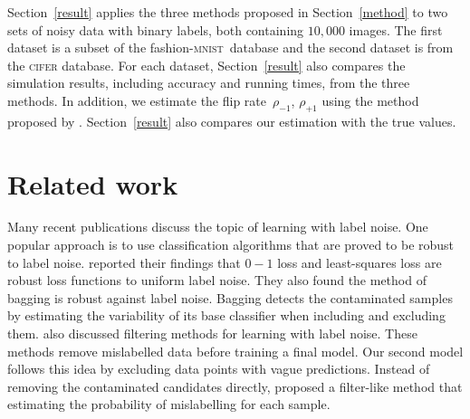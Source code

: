 \documentclass[12pt]{article} %
\newcommand{\rhoo}{\rho_{+1}}
\newcommand{\rhoz}{\rho_{-1}}
\newcommand{\mnist}{fashion-\textsc{mnist}}
\begin{document}
Section~\ref{result} applies the three methods proposed in Section~\ref{method} to two sets of noisy data with binary labels, both containing $10,000$ images. The first dataset is a subset of the \mnist\ database and the second dataset is from the \textsc{cifer} database. For each dataset, Section~\ref{result} also compares the simulation results, including accuracy and running times, from the three methods. In addition, we estimate the flip rate~$\rhoz$, $\rhoo$ using the method proposed by \citet{liu2016classification}.
Section~\ref{result} also compares our estimation with the true values.
\section{Related work}
Many recent publications discuss the topic of learning with label noise. One popular approach is to use classification algorithms that are proved to be robust to label noise. \citet{frenay2014classification} reported their findings that $0-1$ loss and least-squares loss are robust loss functions to uniform label noise. %
They also found the method of bagging is robust against label noise. Bagging detects the contaminated samples by estimating the variability of its base classifier when including and excluding them. %
\citet{frenay2014classification} also discussed filtering methods for learning with label noise. These methods remove mislabelled data before training a final model. Our second model follows this idea by excluding data points with vague predictions. Instead of removing the contaminated candidates directly, \citet{yang2018adasampling} proposed a filter-like method that estimating the probability of mislabelling for each sample.
\end{document}
